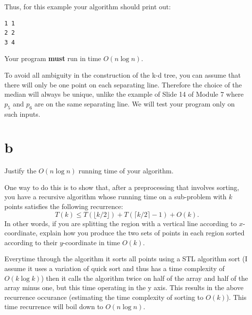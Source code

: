 \documentclass[12pt]{article}
\begin{document}
\begin{enumerate}
Thus, for this example your algorithm should print out:
\begin{verbatim}
1 1
2 2
3 4
\end{verbatim}
Your program {\bf must} run in time $O(n \log n)$.

To avoid all ambiguity in the construction of the k-d tree, you can assume that
there will only be one point on each separating line.
Therefore the choice of the median will always be unique,
unlike the example of Slide 14 of Module 7 where $p_5$ and $p_6$ are on the same separating line.
We will test your program only on such inputs.

\part{b} Justify the $O(n \log n)$ running time of your algorithm.

One way to do this is to show that, after a preprocessing that involves sorting,
you have a recursive algorithm whose running time on a sub-problem with $k$ points
satisfies the following recurrence:
$$T(k) \leq T(\lfloor k/2\rfloor) + T(\lceil k/2 \rceil-1)+ O(k).$$
In other words, if you are splitting the region with a
vertical line according to $x$-coordinate,
explain how you produce the two sets of points in each
region sorted according to their $y$-coordinate in time $O(k)$.

Everytime through the algorithm it sorts all points using a STL algorithm sort (I assume it uses a variation of quick sort and thus has a time complexity of $O(k\log k)$) then it calls the algorithm twice on half of the array and half of the array minus one, but this time operating in the y axis. This results in the above recurrence occurance (estimating the time complexity of sorting to $O(k)$). This time recurrence will boil down to $O(n\log n)$.
\end{enumerate}

\end{document}
